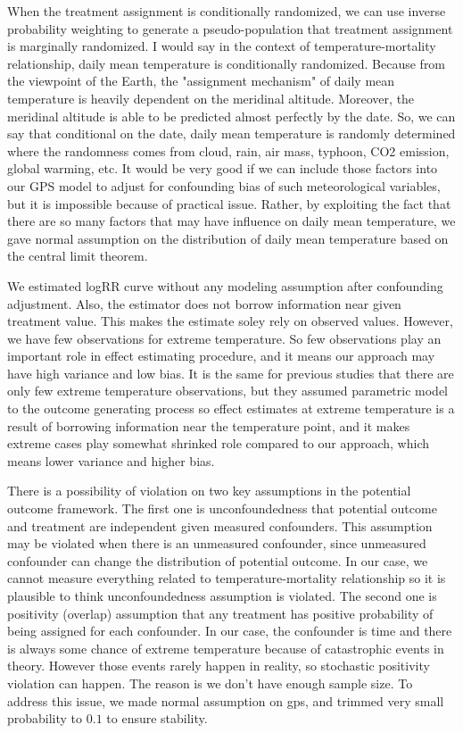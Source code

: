 \documentclass[12pt]{article}
\begin{document}
When the treatment assignment is conditionally randomized, 
we can use inverse probability weighting to generate a pseudo-population
that treatment assignment is marginally randomized.
I would say in the context of temperature-mortality relationship,
daily mean temperature is conditionally randomized.
Because from the viewpoint of the Earth, 
the "assignment mechanism" of daily mean temperature is heavily dependent on the meridinal altitude.
Moreover, the meridinal altitude is able to be predicted almost perfectly by the date.
So, we can say that conditional on the date, daily mean temperature is randomly determined
where the randomness comes from cloud, rain, air mass, typhoon, CO2 emission, global warming, etc.
It would be very good if we can include those factors into our GPS model 
to adjust for confounding bias of such meteorological variables,
but it is impossible because of practical issue.
Rather, by exploiting the fact that 
there are so many factors that may have influence on daily mean temperature,
we gave normal assumption on the distribution of daily mean temperature 
based on the central limit theorem.

We estimated logRR curve without any modeling assumption after confounding adjustment.
Also, the estimator does not borrow information near given treatment value.
This makes the estimate soley rely on observed values.
However, we have few observations for extreme temperature.
So few observations play an important role in effect estimating procedure,
and it means our approach may have high variance and low bias.
It is the same for previous studies that there are only few extreme temperature observations,
but they assumed parametric model to the outcome generating process
so effect estimates at extreme temperature is a result of borrowing information near the temperature point,
and it makes extreme cases play somewhat shrinked role compared to our approach,
which means lower variance and higher bias.

There is a possibility of violation on two key assumptions in the potential outcome framework.
The first one is unconfoundedness
that potential outcome and treatment are independent given measured confounders.
This assumption may be violated when there is an unmeasured confounder,
since unmeasured confounder can change the distribution of potential outcome.
In our case, we cannot measure everything related to temperature-mortality relationship
so it is plausible to think unconfoundedness assumption is violated.
The second one is positivity (overlap) assumption
that any treatment has positive probability of being assigned for each confounder.
In our case, the confounder is time and 
there is always some chance of extreme temperature because of catastrophic events in theory.
However those events rarely happen in reality, 
so stochastic positivity violation\cite{zivich2022} can happen.
The reason is we don't have enough sample size.
To address this issue, we made normal assumption on gps,
and trimmed very small probability to $0.1$ to ensure stability.


{}

\end{document}
